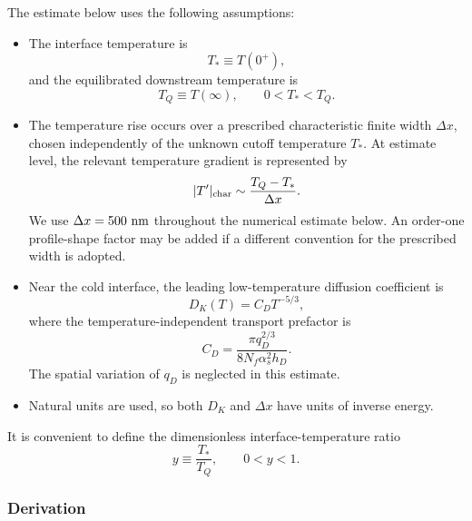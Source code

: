The estimate below uses the following assumptions:
\begin{itemize}
\item The interface temperature is
\begin{equation}
T_* \equiv T(0^+),
\end{equation}
and the equilibrated downstream temperature is
\begin{equation}
T_Q \equiv T(\infty),
\qquad 0<T_*<T_Q.
\end{equation}
\item The temperature rise occurs over a prescribed characteristic finite
width \(\Delta x\), chosen independently of the unknown cutoff temperature
\(T_*\).  At estimate level, the relevant temperature gradient is represented
by
\begin{equation}
|T'|_{\rm char}
\sim
\frac{T_Q-T_*}{\Delta x}.
\end{equation}
We use \(\Delta x=500\ {\rm nm}\) throughout the numerical estimate below.
An order-one profile-shape factor may be added if a different convention for
the prescribed width is adopted.
\item Near the cold interface, the leading low-temperature diffusion
coefficient is
\begin{equation}
D_K(T)=C_D T^{-5/3},
\end{equation}
where the temperature-independent transport prefactor is
\begin{equation}
C_D
=
\frac{\pi q_D^{2/3}}
{8N_f\alpha_s^2h_D}.
\end{equation}
The spatial variation of \(q_D\) is neglected in this estimate.
\item Natural units are used, so both \(D_K\) and \(\Delta x\) have units of
inverse energy.
\end{itemize}

It is convenient to define the dimensionless interface-temperature ratio
\begin{equation}
y\equiv\frac{T_*}{T_Q},
\qquad 0<y<1.
\end{equation}

\subsubsection{Derivation}

